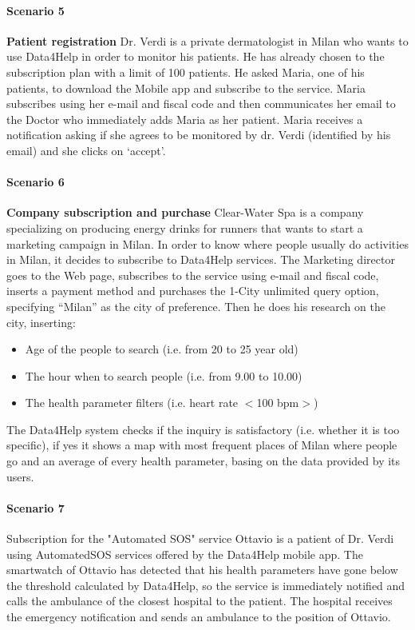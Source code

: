 \paragraph{Scenario 5} \textbf{Patient registration} \newline
Dr. Verdi is a private dermatologist in Milan who wants to use Data4Help in order to monitor his patients. He has already chosen to the  subscription plan with a limit of 100 patients. He asked Maria, one of his patients, to download the Mobile app and subscribe to the service.
Maria subscribes using her e-mail and fiscal code and then communicates her email to the Doctor who immediately adds Maria as her patient. Maria receives a notification asking if she agrees to be monitored by dr. Verdi (identified by his email) and she clicks on ‘accept’.



\paragraph{Scenario 6} \textbf{Company subscription and purchase} \newline
Clear-Water Spa is a company specializing on producing energy drinks for runners that wants to start a marketing campaign in Milan. In order to know where people usually do activities in Milan, it decides to subscribe to Data4Help services. The Marketing director goes to the Web page, subscribes to the service using e-mail and fiscal code, inserts a payment method and purchases the 1-City unlimited query option, specifying “Milan” as the city of preference.
Then he does his research on the city, inserting:
\begin{itemize}
    \item Age of the people to search (i.e. from 20 to 25 year old)
    \item The hour when to search people (i.e. from 9.00 to 10.00)
    \item The health parameter filters (i.e. heart rate $<$100 bpm$>$)
\end{itemize}
 The Data4Help system checks if the inquiry is satisfactory (i.e. whether it is too specific), if yes it shows a map with most frequent places of Milan where people go and an average of every health parameter, basing on the data provided by its users. 



\paragraph{Scenario 7}Subscription for the "Automated SOS" service \newline
Ottavio is a patient of Dr. Verdi using AutomatedSOS services offered by the Data4Help mobile app. The smartwatch of Ottavio has detected that his health parameters have gone below the threshold calculated by Data4Help, so the service is immediately notified and calls the ambulance of the closest hospital to the patient. The hospital receives the emergency notification  and sends an ambulance  to the position of Ottavio.


